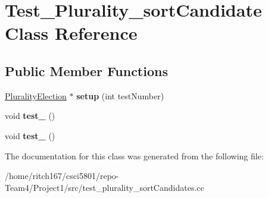 \hypertarget{classTest__Plurality__sortCandidate}{}\section{Test\+\_\+\+Plurality\+\_\+sort\+Candidate Class Reference}
\label{classTest__Plurality__sortCandidate}
\subsection*{Public Member Functions}
\begin{DoxyCompactItemize}
\item 
\mbox{\label{classTest__Plurality__sortCandidate_abc47eb764025473e5c3eea8714aa7c73}} 
\hyperlink{classPluralityElection}{Plurality\+Election} $\ast$ {\bfseries setup} (int test\+Number)
\item 
\mbox{\label{classTest__Plurality__sortCandidate_a4356cc912cf613d9201a07941fb0ad65}} 
void {\bfseries test\+\_} ()
\item 
\mbox{\label{classTest__Plurality__sortCandidate_a2f0f7d33258f1c2b7cf84edfde3f25e4}} 
void {\bfseries test\+\_} ()
\end{DoxyCompactItemize}


The documentation for this class was generated from the following file\+:\begin{DoxyCompactItemize}
\item 
/home/ritch167/csci5801/repo-\/\+Team4/\+Project1/src/test\+\_\+plurality\+\_\+sort\+Candidates.\+cc\end{DoxyCompactItemize}
